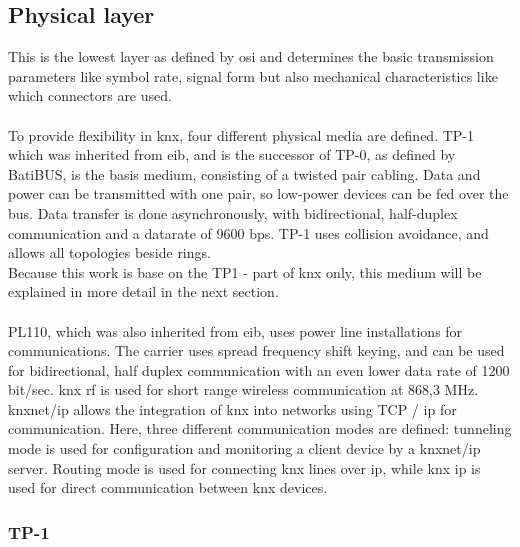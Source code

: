 \subsection{Physical layer}
This is the lowest layer as defined by \gls{osi} and determines the basic transmission parameters like symbol rate, signal form but also mechanical 
characteristics like which connectors are used.
\\
\\
To provide flexibility in \gls{knx}, four different physical media are defined. \gls{TP}-1 which was inherited from \gls{eib}, and is the successor of \gls{TP}-0,
as defined by BatiBUS, is the basis medium, consisting of a twisted pair cabling. Data and power can be transmitted with one pair, so low-power
devices can be fed over the bus. Data transfer is done asynchronously, with bidirectional, half-duplex
communication and a datarate of 9600 \gls{bps}. \gls{TP}-1 uses collision avoidance, and allows all topologies beside rings. 
\\
Because this work is base on the \gls{TP}1 - part of \gls{knx} only, this medium will be explained in more detail in the next section.
\\
\\
PL110, which was also inherited from \gls{eib}, uses power line installations for communications. The carrier uses spread frequency shift keying, and can be used 
for bidirectional, half duplex  communication with an even lower data rate of 1200 bit/sec. \gls{knx} \gls{rf} is used for short range wireless communication
at 868,3 MHz. \gls{knx}net/\gls{ip} allows the integration of \gls{knx} into networks using \gls{TCP} / \gls{ip} for communication. Here, three different communication
modes are defined: tunneling mode is used for configuration and monitoring a client device by a \gls{knx}net/\gls{ip} server. Routing mode is used
for connecting \gls{knx} lines over \gls{ip}, while \gls{knx} \gls{ip} is used for direct communication between \gls{knx} devices. \cite{KraInnosec2013}

\subsubsection{TP-1}

